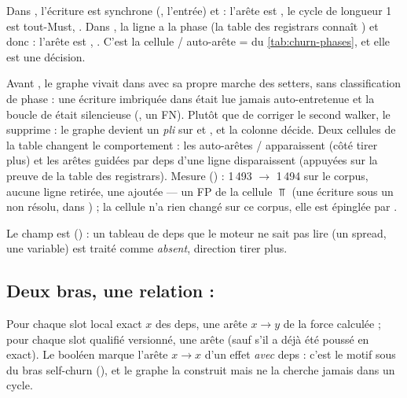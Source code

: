 
Dans , l'écriture est synchrone (, l'entrée) et
 : l'arête est , le cycle de longueur 1 est tout-Must, \Error.
Dans , la ligne a la phase  (la table des registrars
connaît ) et donc  : l'arête est , \Warning.
C'est la cellule \og {} / auto-arête = \fg{} du
\cref{tab:churn-phases}, et elle est une décision.

\begin{decision}[ADR-42 \S4]
Avant , le graphe vivait dans  avec sa propre marche des setters,
sans classification de phase : une écriture imbriquée dans  était lue \og jamais
auto-entretenue\fg{} et la boucle de  était silencieuse (, un
FN). Plutôt que de corriger le second walker,  le supprime : le graphe devient un
\emph{pli} sur  et , et la colonne
 décide. Deux cellules de la table changent le comportement : les auto-arêtes
/ apparaissent (côté \og tirer plus\fg) et les arêtes guidées
par deps d'une ligne  disparaissent (appuyées sur la preuve de la table des
registrars). Mesure () : 1\,493 $\to$ 1\,494 sur le corpus,
aucune ligne retirée, une ajoutée --- un \Warning{} FP de la cellule $\Top$ (une écriture
sous un  non résolu, dans ) ; la cellule
 n'a rien changé sur ce corpus, elle est épinglée par .
\end{decision}

Le champ  est 
() : un tableau de deps que le moteur ne sait pas lire
(un spread, une variable) est traité comme \emph{absent}, direction \og tirer plus\fg.

\subsection{Deux bras, une relation : }


Pour chaque slot local exact $x$ des deps, une arête $x \to y$ de la force calculée ; pour
chaque slot qualifié versionné, une arête  (sauf s'il a déjà été poussé en exact).
Le booléen  marque l'arête $x \to x$ d'un effet \emph{avec} deps : c'est le
motif  sous \code{[obj]} du bras self-churn (), et le graphe
la construit mais ne la cherche jamais dans un cycle.

